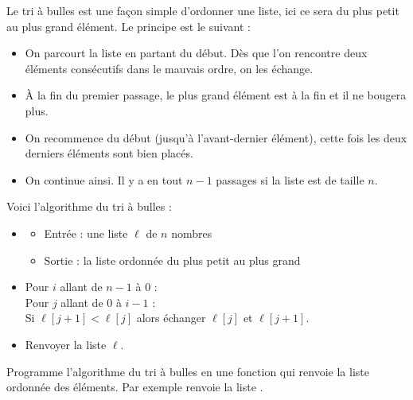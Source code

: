 \documentclass[11pt,class=report,crop=false]{standalone}
\begin{document}
\begin{activite}


Le tri à bulles est une façon simple d'ordonner une liste, ici ce sera du plus petit au plus grand élément.
Le principe est le suivant :
\begin{itemize}
  \item On parcourt la liste en partant du début. Dès que l'on rencontre deux éléments consécutifs dans le mauvais ordre, on les échange. 
  \item À la fin du premier passage, le plus grand élément est à la fin et il ne bougera plus.
  \item On recommence du début (jusqu'à l'avant-dernier élément), cette fois les deux derniers éléments sont bien placés.
  \item On continue ainsi. Il y a en tout $n-1$ passages si la liste est de taille $n$. 
\end{itemize}



\medskip

Voici l'algorithme du tri à bulles :
  \begin{algorithme}
  \sauteligne 
 \begin{itemize}
   \item
   \begin{itemize}
     \item Entrée : une liste $\ell$ de $n$ nombres
     \item Sortie : la liste ordonnée du plus petit au plus grand
   \end{itemize}

   \item Pour $i$ allant de $n-1$ à $0$ :\\
   \indentation Pour $j$ allant de $0$ à $i-1$ :\\
   \indentation\indentation Si $\ell[j+1] < \ell[j]$ alors échanger $\ell[j]$ et $\ell[j+1]$.
   \item Renvoyer la liste $\ell$.
 \end{itemize}  
 \end{algorithme}
 

Programme l'algorithme du tri à bulles en une fonction  qui renvoie la liste ordonnée des éléments. Par exemple  renvoie la liste \ci{[4,6,6,7,8,11,12,13]}.


\end{activite}
\end{document}

